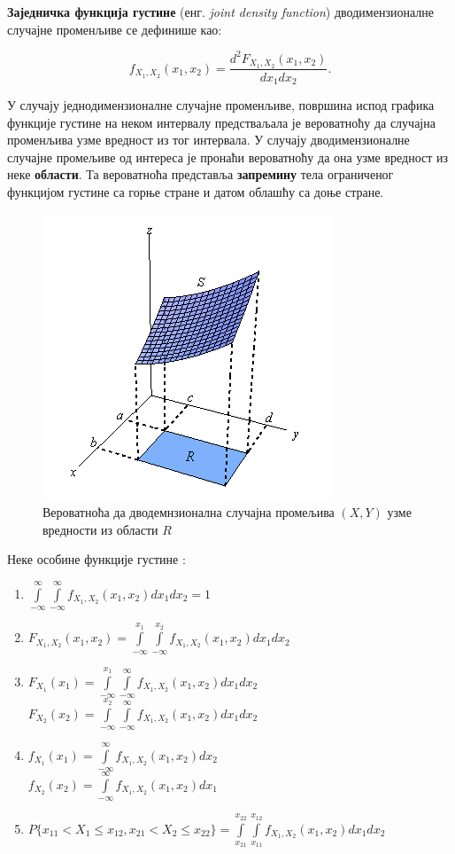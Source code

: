 \textbf{Заједничка функција густине} (енг. \textit{joint density function}) дводимензионалне случајне променљиве се дефинише као:

\begin{equation}
f_{X_1,X_2}(x_1,x_2) = \frac{d^2 F_{X_1,X_2}(x_1,x_2)}{dx_1dx_2}.
\end{equation}

У случају једнодимензионалне случајне променљиве, површина испод графика функције густине на неком интервалу предстваљала је вероватноћу да случајна променљива узме вредност из тог интервала. У случају дводимензионалне случајне промељиве од интереса је пронаћи вероватноћу да она узме вредност из неке \textbf{области}. Та вероватноћа представља \textbf{запремину} тела ограниченог функцијом густине са горње стране и датом облашћу са доње стране.

\begin{figure}[H]
    \centering
\captionsetup{justification=centering}
   \includegraphics[scale=0.8]{./Slike/slika18.png} 
	\caption{Вероватноћа да дводемнзионална случајна промељива $(X,Y)$ узме вредности из области $R$} 
	\label{fig:slika18}
\end{figure}

 
Неке особине функције густине :

\begin{enumerate}
\item  $ \int \limits_{-\infty}^{\infty}\int \limits_{-\infty}^{\infty} f_{X_1,X_2}(x_1,x_2)dx_1dx_2 = 1$
\item  $F_{X_1,X_2}(x_1,x_2) =  \int \limits_{-\infty}^{x_1}\int \limits_{-\infty}^{x_2} f_{X_1,X_2}(x_1,x_2)dx_1dx_2$
\item  $F_{X_1}(x_1) =  \int \limits_{-\infty}^{x_1}\int \limits_{-\infty}^{\infty} f_{X_1,X_2}(x_1,x_2)dx_1dx_2$ \\
$F_{X_2}(x_2) =  \int \limits_{-\infty}^{x_2}\int \limits_{-\infty}^{\infty} f_{X_1,X_2}(x_1,x_2)dx_1dx_2$ 
\item $f_{X_1}(x_1) =  \int \limits_{-\infty}^{\infty} f_{X_1,X_2}(x_1,x_2)dx_2$ \\
$f_{X_2}(x_2) =  \int \limits_{-\infty}^{\infty} f_{X_1,X_2}(x_1,x_2)dx_1$ 
\item $P \lbrace x_{11} < X_1 \leq x_{12}, x_{21}<X_2 \leq x_{22} \rbrace =  \int \limits_{x_{21}}^{x_{22}}\int \limits_{x_{11}}^{x_{12}} f_{X_1,X_2}(x_1,x_2)dx_1dx_2 $
	
\end{enumerate}


